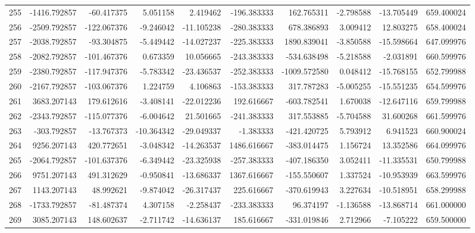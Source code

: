 \begin{tabular}{lrrrrrrrrr}
255 &  -1416.792857 &   -60.417375 &   5.051158 &   2.419462 &  -196.383333 &   162.765311 &  -2.798588 & -13.705449 &  659.400024 \\
256 &  -2509.792857 &  -122.067376 &  -9.246042 & -11.105238 &  -280.383333 &   678.386893 &   3.009412 &  12.803275 &  658.400024 \\
257 &  -2038.792857 &   -93.304875 &  -5.449442 & -14.027237 &  -225.383333 &  1890.839041 &  -3.850588 & -15.598664 &  647.099976 \\
258 &  -2082.792857 &  -101.467376 &   0.673359 &  10.056665 &  -243.383333 &  -534.638498 &  -5.218588 &  -2.031891 &  660.599976 \\
259 &  -2380.792857 &  -117.947376 &  -5.783342 & -23.436537 &  -252.383333 & -1009.572580 &   0.048412 & -15.768155 &  652.799988 \\
260 &  -2167.792857 &  -103.067376 &   1.224759 &   4.106863 &  -153.383333 &   317.787283 &  -5.005255 & -15.551235 &  654.599976 \\
261 &   3683.207143 &   179.612616 &  -3.408141 & -22.012236 &   192.616667 &  -603.782541 &   1.670038 & -12.647116 &  659.799988 \\
262 &  -2343.792857 &  -115.077376 &  -6.004642 &  21.501665 &  -241.383333 &   317.553885 &  -5.704588 &  31.600268 &  661.599976 \\
263 &   -303.792857 &   -13.767373 & -10.364342 & -29.049337 &    -1.383333 &  -421.420725 &   5.793912 &   6.941523 &  660.900024 \\
264 &   9256.207143 &   420.772651 &  -3.048342 & -14.263537 &  1486.616667 &  -383.014475 &   1.156724 &  13.352586 &  664.099976 \\
265 &  -2064.792857 &  -101.637376 &  -6.349442 & -23.325938 &  -257.383333 &  -407.186350 &   3.052411 & -11.335531 &  650.799988 \\
266 &   9751.207143 &   491.312629 &  -0.950841 & -13.686337 &  1367.616667 &  -155.550607 &   1.337524 & -10.953939 &  663.599976 \\
267 &   1143.207143 &    48.992621 &  -9.874042 & -26.317437 &   225.616667 &  -370.619943 &   3.227634 & -10.518951 &  658.299988 \\
268 &  -1733.792857 &   -81.487374 &   4.307158 &  -2.258437 &  -233.383333 &    96.374197 &  -1.136588 & -13.868714 &  661.000000 \\
269 &   3085.207143 &   148.602637 &  -2.711742 & -14.636137 &   185.616667 &  -331.019846 &   2.712966 &  -7.105222 &  659.500000 \\

\end{tabular}

